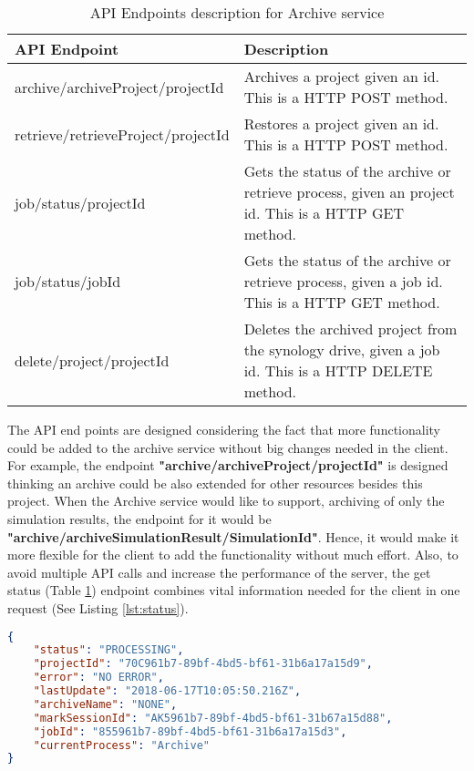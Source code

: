     \begin{table}[H]
        \centering
        \begin{tabular}{|p{6cm}|p{8cm}|}
            \hline
                \textbf{API Endpoint}&\textbf{Description}\\
            \hline
                archive/archiveProject/{{projectId}} & Archives a project given an id. This is a HTTP POST method.\\
            \hline
                retrieve/retrieveProject/{{projectId}} & Restores a project given an id. This is a HTTP POST method.\\
            \hline
                job/status/{{projectId}} & Gets the status of the archive or retrieve process, given an project id. This is a HTTP GET method.\\
            \hline
                job/status/{{jobId}} & Gets the status of the archive or retrieve process, given a job id. This is a HTTP GET method.\\
            \hline
                delete/project/{{projectId}} & Deletes the archived project from the synology drive, given a job id. This is a HTTP DELETE method.\\
            \hline
        \end{tabular}
        \caption{API Endpoints description for Archive service}
        \label{table:archiveEndpoints}     
    \end{table}  

    The API end points are designed considering the fact that more functionality could be added to the archive service without big changes needed in the client. 
    For example, the endpoint \textbf{"archive/archiveProject/{{projectId}}"} is designed thinking an archive could be also extended for other resources besides this project. When
    the Archive service would like to support, archiving of only the simulation results, the endpoint for it would be \textbf{"archive/archiveSimulationResult/{{SimulationId}}"}.
    Hence, it would make it more flexible for the client to add the functionality without much effort. Also, to avoid multiple API calls and
    increase the performance of the server, the get status (Table \ref{table:archiveEndpoints}) endpoint combines vital information needed for the client in one 
    request (See Listing \ref{lst:status}). 
    
\begin{lstlisting}[caption={Sucessful GET request for a archive status}, language=json,firstnumber=1, captionpos=b, label={lst:status}]
{
    "status": "PROCESSING",
    "projectId": "70C961b7-89bf-4bd5-bf61-31b6a17a15d9",
    "error": "NO ERROR",
    "lastUpdate": "2018-06-17T10:05:50.216Z",
    "archiveName": "NONE",
    "markSessionId": "AK5961b7-89bf-4bd5-bf61-31b67a15d88",
    "jobId": "855961b7-89bf-4bd5-bf61-31b6a17a15d3",
    "currentProcess": "Archive"
}
\end{lstlisting}







    

